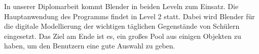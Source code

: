 In unserer Diplomarbeit kommt Blender in beiden Leveln zum Einsatz. Die Hauptanwendung des Programms findet in Level 2 statt. Dabei wird Blender für die digitale Modellierung der wichtigen täglichen Gegenstände von Schülern eingesetzt. Das Ziel am Ende ist es, ein großes Pool aus einigen Objekten zu haben, um den Benutzern eine gute Auswahl zu geben.
